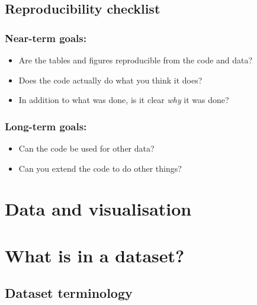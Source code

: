 \documentclass[
]{book}
\providecommand{\tightlist}{%
  \setlength{\itemsep}{0pt}\setlength{\parskip}{0pt}}
\theoremstyle{definition}
\theoremstyle{definition}
\theoremstyle{definition}
\theoremstyle{definition}
\theoremstyle{remark}
\begin{document}
\hypertarget{reproducibility-checklist}{%
\section{Reproducibility checklist}\label{reproducibility-checklist}}

\hypertarget{near-term-goals}{%
\subsection{Near-term goals:}\label{near-term-goals}}

\begin{itemize}
\tightlist
\item
  Are the tables and figures reproducible from the code and data?
\item
  Does the code actually do what you think it does?
\item
  In addition to what was done, is it clear \emph{why} it was done?
\end{itemize}

\hypertarget{long-term-goals}{%
\subsection{Long-term goals:}\label{long-term-goals}}

\begin{itemize}
\tightlist
\item
  Can the code be used for other data?
\item
  Can you extend the code to do other things?
\end{itemize}

\hypertarget{data-and-visualisation-1}{%
\chapter{Data and visualisation}\label{data-and-visualisation-1}}

\hypertarget{what-is-in-a-dataset-1}{%
\chapter{What is in a dataset?}\label{what-is-in-a-dataset-1}}

\hypertarget{dataset-terminology-1}{%
\section{Dataset terminology}\label{dataset-terminology-1}}
\end{document}

